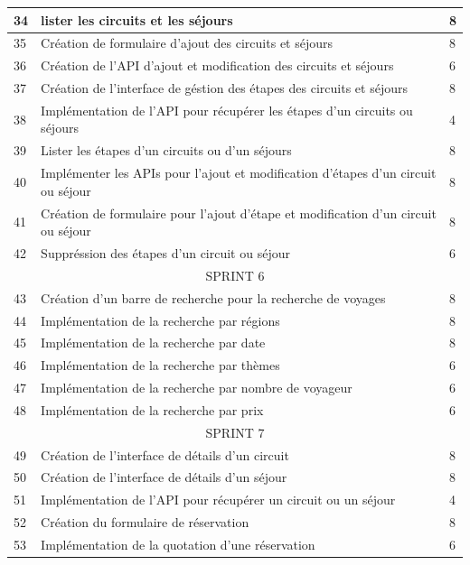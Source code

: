\documentclass[12pt]{report}
\begin{document}
\begin{longtable}{|p{1cm}|p{7cm}|p{6cm}|}
						34 & lister les circuits et les séjours & 8\\
						\hline
						35 & Création de formulaire d'ajout des circuits et séjours & 8\\
						\hline
					 	36 & Création de l'API d'ajout et modification des circuits et séjours & 6\\
						\hline
						37 & Création de l'interface de géstion des étapes des circuits et séjours & 8\\
						\hline
						38 & Implémentation de l'API pour récupérer les étapes d'un circuits ou séjours & 4\\
						\hline
						39 & Lister les étapes d'un circuits ou d'un séjours & 8\\
						\hline
						40 & Implémenter les APIs pour l'ajout et modification d'étapes d'un circuit ou séjour & 8\\
						\hline
						41 & Création de formulaire pour l'ajout d'étape et modification d'un circuit ou séjour & 8\\
						\hline
						42 &  Suppréssion des étapes d'un circuit ou séjour & 6\\
						\hline
						\multicolumn{3}{|c|}{SPRINT 6}\\
						\hline
						43 & Création d'un barre de recherche pour la recherche de voyages & 8\\
						\hline
						44 & Implémentation de la recherche par régions & 8\\
						\hline
						45 & Implémentation de la recherche par date & 8\\
						\hline
						46 & Implémentation de la recherche par thèmes & 6\\
						\hline
						47 & Implémentation de la recherche par nombre de voyageur & 6\\
						\hline
						48 & Implémentation de la recherche par prix & 6\\
						\hline
						\multicolumn{3}{|c|}{SPRINT 7}\\
						\hline
						49 & Création de l'interface de détails d'un circuit & 8\\
						\hline
						50 & Création de l'interface de détails d'un séjour & 8\\
						\hline
						51 & Implémentation de l'API pour récupérer un circuit ou un séjour & 4\\
						\hline
						52 & Création du formulaire de réservation & 8\\
						\hline
						53 & Implémentation de la quotation d'une réservation & 6\\ 

\end{longtable}
\end{document}
